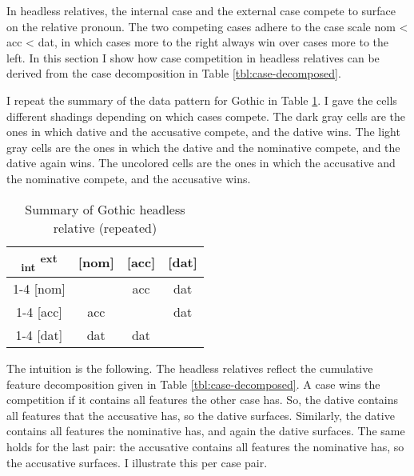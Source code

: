 In headless relatives, the internal case and the external case compete to surface on the relative pronoun. The two competing cases adhere to the case scale \ac{nom} < \ac{acc} < \ac{dat}, in which cases more to the right always win over cases more to the left. In this section I show how case competition in headless relatives can be derived from the case decomposition in Table \ref{tbl:case-decomposed}.

I repeat the summary of the data pattern for Gothic in Table \ref{tbl:summary-gothic-deriving}. I gave the cells different shadings depending on which cases compete. The dark gray cells are the ones in which dative and the accusative compete, and the dative wins. The light gray cells are the ones in which the dative and the nominative compete, and the dative again wins. The uncolored cells are the ones in which the accusative and the nominative compete, and the accusative wins.

\begin{table}[ht]
  \center
  \caption {Summary of Gothic headless relative (repeated)}
  \begin{tabular}{c|c|c|c}
    \toprule
        \textsubscript{\ac{int}} \textsuperscript{\ac{ext}}
          & [\ac{nom}]
          & [\ac{acc}]
          & [\ac{dat}]
          \\ \cmidrule{1-4}
      [\ac{nom}]
          &
          & \ac{acc}
          & \cellcolor{LG}\ac{dat}
          \\ \cmidrule{1-4}
      [\ac{acc}]
          & \ac{acc}
          &
          & \cellcolor{DG}\ac{dat}
          \\ \cmidrule{1-4}
      [\ac{dat}]
          & \cellcolor{LG}\ac{dat}
          & \cellcolor{DG}\ac{dat}
          &
          \\
    \bottomrule
  \end{tabular}
    \label{tbl:summary-gothic-deriving}
\end{table}

The intuition is the following. The headless relatives reflect the cumulative feature decomposition given in Table \ref{tbl:case-decomposed}. A case wins the competition if it contains all features the other case has. So, the dative contains all features that the accusative has, so the dative surfaces. Similarly, the dative contains all features the nominative has, and again the dative surfaces. The same holds for the last pair: the accusative contains all features the nominative has, so the accusative surfaces. I illustrate this per case pair.

